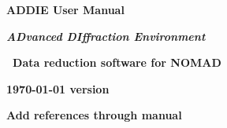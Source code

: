 \documentclass{report}
\begin{document}
{\let\cleardoublep
\clearpage 
\begin{titlepage}
	\centering
	\vspace{1cm}
	\vspace{2cm}
	{\huge\bfseries ADDIE User Manual\par}
	{\LARGE\bfseries\itshape ADvanced DIffraction Environment\par}
	\vspace{1cm}
	{\Large\bfseries\ Data reduction software for NOMAD\par}
	\vfill
	{\large\bfseries \today{} version \par}
\end{titlepage}
 

 \tableofcontents

}

 




\textbf{Add references through manual}
\end{document}
